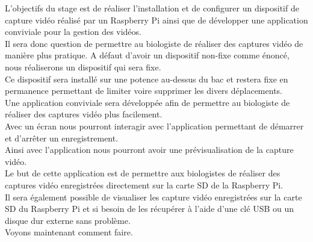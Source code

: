     \begin{flushleft}
        L’objectifs du stage est de réaliser l’installation et de configurer un dispositif de capture vidéo réalisé par un Raspberry Pi ainsi que de développer une application conviviale pour la gestion des vidéos.
        \\[0.2cm]

        Il sera donc question de permettre au biologiste de réaliser des captures vidéo de manière plus pratique.
        A défaut d'avoir un dispositif non-fixe comme énoncé, nous réaliserons un dispositif qui sera fixe.\\[0.2cm]

        Ce dispositif sera installé sur une potence au-dessus du bac et restera fixe en permanence permettant de limiter voire supprimer les divers déplacements.\\[0.2cm]                
        
        Une application conviviale sera développée afin de permettre au biologiste de réaliser des captures vidéo plus facilement.\\[0.2cm]

        Avec un écran nous pourront interagir avec l'application permettant de démarrer et d'arrêter un enregistrement.\\[0.2cm]

        Ainsi avec l'application nous pourront avoir une prévisualisation de la capture vidéo.\\[0.2cm]
    
        Le but de cette application est de permettre aux biologistes de réaliser des captures vidéo enregistrées directement sur la carte SD de la Raspberry Pi.\\[0.2cm]

        Il sera également possible de visualiser les capture vidéo enregistrées sur la carte SD du Raspberry Pi et si besoin de les récupérer à l'aide d'une clé USB ou un disque dur externe sans problème.\\[0.2cm]

        Voyons maintenant comment faire.
    \end{flushleft}